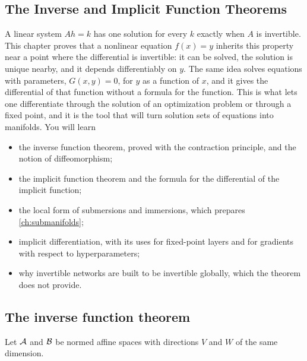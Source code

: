 \begin{notechapter}
\chapter{The Inverse and Implicit Function Theorems}
\label{ch:inverse-implicit}

\begin{chapterintro}
A linear system $Ah = k$ has one solution for every $k$ exactly when $A$
is invertible. This chapter proves that a nonlinear equation
$f(x) = y$ inherits this property near a point where the differential is
invertible: it can be solved, the solution is unique nearby, and it
depends differentiably on $y$. The same idea solves equations with
parameters, $G(x, y) = 0$, for $y$ as a function of $x$, and it gives the
differential of that function without a formula for the function. This is
what lets one differentiate through the solution of an optimization
problem or through a fixed point, and it is the tool that will turn
solution sets of equations into manifolds. You will learn
\begin{itemize}[nosep]
  \item the inverse function theorem, proved with the contraction
        principle, and the notion of diffeomorphism;
  \item the implicit function theorem and the formula for the
        differential of the implicit function;
  \item the local form of submersions and immersions, which prepares
        \cref{ch:submanifolds};
  \item implicit differentiation, with its uses for fixed-point layers
        and for gradients with respect to hyperparameters;
  \item why invertible networks are built to be invertible globally, which
        the theorem does not provide.
\end{itemize}
\end{chapterintro}

\section{The inverse function theorem}\label{inverse-implicit:sec:inverse}

Let $\mathcal{A}$ and $\mathcal{B}$ be normed affine spaces with directions $V$ and $W$
of the same dimension.


\end{notechapter}
